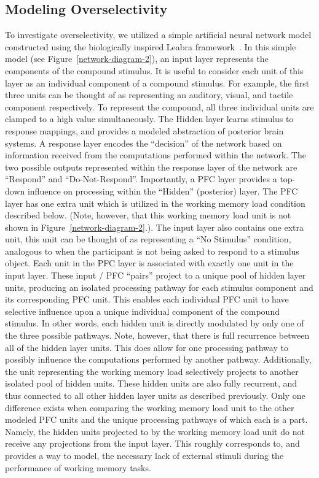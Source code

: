 \subsection{Modeling Overselectivity}
To investigate overselectivity, we utilized a simple artificial neural network model constructed using the biologically inspired Leabra framework~\cite{OReillyRC:2000:Computational}.   In this simple model (see Figure~\ref{network-diagram-2}), an input layer represents the components of the compound stimulus. It is useful to consider each unit of this layer as an individual component of a compound stimulus.  For example, the first three units can be thought of as representing an auditory, visual, and tactile component respectively.  To represent the compound, all three individual units are clamped to a high value simultaneously.  The Hidden layer learns stimulus to response mappings, and provides a modeled abstraction of posterior brain systems.  A response layer encodes the ``decision'' of the network based on information received from the computations performed within the network.  The two possible outputs represented within the response layer of the network are ``Respond'' and ``Do-Not-Respond''.  Importantly, a PFC layer provides a top-down influence on processing within the ``Hidden'' (posterior) layer.  The PFC layer has one extra unit which is utilized in the working memory load condition described below. (Note, however, that this working memory load unit is not shown in Figure~\ref{network-diagram-2}.).  The input layer also contains one extra unit, this unit can be thought of as representing a ``No Stimulus'' condition, analogous to when the participant is not being asked to respond to a stimulus object.  Each unit in the PFC layer is associated with exactly one unit in the input layer.  These input / PFC ``pairs'' project to a unique pool of hidden layer units, producing an isolated processing pathway for each stimulus component and its corresponding PFC unit.  This enables each individual PFC unit to have selective influence upon a unique individual component of the compound stimulus.  In other words, each hidden unit is directly modulated by only one of the three possible pathways.  Note, however, that there is full recurrence between all of the hidden layer units.  This does allow for one processing pathway to possibly influence the computations performed by another pathway.  Additionally, the unit representing the working memory load selectively projects to another isolated pool of hidden units.  These hidden units are also fully recurrent, and thus connected to all other hidden layer units as described previously.  Only one difference exists when comparing the working memory load unit to the other modeled PFC units and the unique processing pathways of which each is a part. Namely, the hidden units projected to by the working memory load unit do not receive any projections from the input layer.  This roughly corresponds to, and provides a way to model, the necessary lack of external stimuli during the performance of working memory tasks. 

